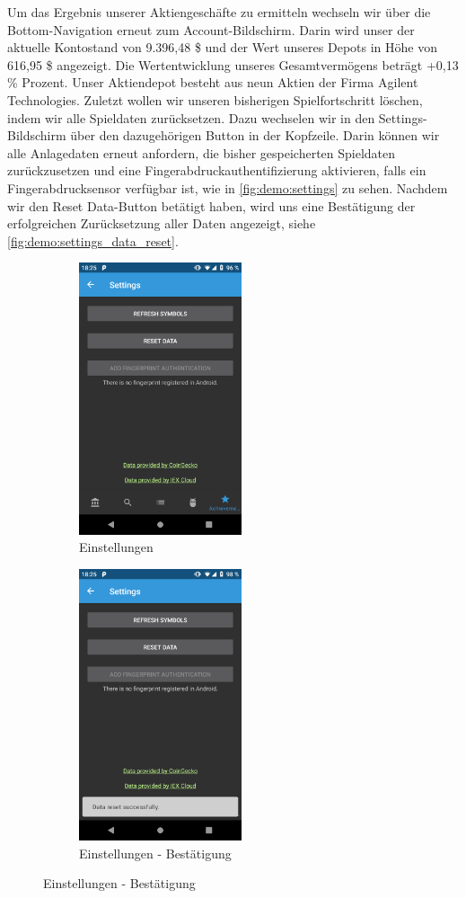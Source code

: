 \documentclass[a4paper]{article}
\begin{document}
Um das Ergebnis unserer Aktiengeschäfte zu ermitteln wechseln wir über die Bottom-Navigation erneut zum Account-Bildschirm. Darin wird unser der aktuelle Kontostand von 9.396,48 \$ und der Wert unseres Depots in Höhe von 616,95 \$ angezeigt. Die Wertentwicklung unseres Gesamtvermögens beträgt +0,13 \% Prozent. Unser Aktiendepot besteht aus neun Aktien der Firma Agilent Technologies.\newline
Zuletzt wollen wir unseren bisherigen Spielfortschritt löschen, indem wir alle Spieldaten zurücksetzen. Dazu wechselen wir in den Settings-Bildschirm über den dazugehörigen Button in der Kopfzeile. Darin können wir alle Anlagedaten erneut anfordern, die bisher gespeicherten Spieldaten zurückzusetzen und eine Fingerabdruckauthentifizierung aktivieren, falls ein Fingerabdrucksensor verfügbar ist, wie in \autoref{fig:demo:settings} zu sehen. Nachdem wir den Reset Data-Button betätigt haben, wird uns eine Bestätigung der erfolgreichen Zurücksetzung aller Daten angezeigt, siehe \autoref{fig:demo:settings_data_reset}.

\begin{figure}[H]
	\begin{subfigure}{.5\textwidth}
		\centering
		\includegraphics[height=8cm,keepaspectratio]{./images/demo/settings.png}
		\caption{Einstellungen}
		\label{fig:demo:settings}
	\end{subfigure}
	\begin{subfigure}{.5\textwidth}
		\centering
		\includegraphics[height=8cm,keepaspectratio]{./images/demo/settings_data_reset.png}
		\caption{Einstellungen - Bestätigung}
		\label{fig:demo:settings_data_reset}
	\end{subfigure}
\end{figure}
\end{document}
